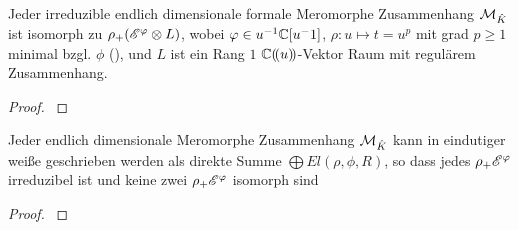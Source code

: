

\begin{prop}
  \cite[Prop 3.1]{sabbah_Fourier-local}
  Jeder irreduzible endlich dimensionale formale Meromorphe Zusammenhang
  $\mathcal{M}_{\hat K}$ ist isomorph zu $\rho_+(\mathscr{E}^\varphi\otimes L)$, wobei $\varphi\in
  u^{-1}\mathbb{C}[u^-1]$, $\rho:u\mapsto t=u^p$ mit grad $p\geq1$ minimal bzgl. $\phi$
  (\cite[Rem 2.8]{sabbah_Fourier-local}), und $L$ ist ein Rang $1$
  ${\mathbb C (\!(u)\!)}$-Vektor Raum mit regulärem Zusammenhang.
\end{prop}
\begin{proof}
  \cite[Prop 3.1]{sabbah_Fourier-local}
\end{proof}

\begin{thm}
  \cite[Cor 3.3]{sabbah_Fourier-local}
  Jeder endlich dimensionale Meromorphe Zusammenhang $\mathcal{M}_{\hat K}$ kann in
  eindutiger weiße geschrieben werden als direkte Summe $\bigoplus
  El(\rho,\phi,R)$, so dass jedes $\rho_+\mathscr{E}^\varphi$ irreduzibel ist und keine
  zwei $\rho_+\mathscr{E}^\varphi$ isomorph sind
\end{thm}
\begin{proof}
  \cite[Cor 3.3]{sabbah_Fourier-local}
\end{proof}


